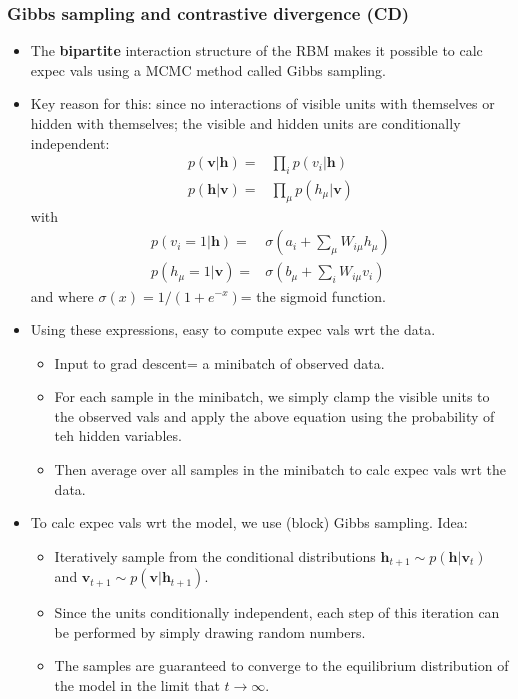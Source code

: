 \documentclass[norsk,a4paper,11pt]{article}
\begin{document}
\subsubsection{Gibbs sampling and contrastive divergence (CD)}
\begin{itemize}
	\item The \textbf{bipartite} interaction structure of the RBM makes it possible to calc expec vals using a MCMC method called Gibbs sampling.
	\item Key reason for this: since no interactions of visible units with themselves or hidden with themselves; the visible and hidden units are conditionally independent:
	\begin{align}
		p(\bm{v}|\bm{h}) =& \prod_i p(v_i | \bm{h}) \\
		p(\bm{h}|\bm{v}) =& \prod_\mu p(h_\mu| \bm{v})
	\end{align}
	with
	\begin{align}
		p(v_i = 1| \bm{h}) =& \sigma(a_i + \sum_\mu W_{i\mu} h_\mu) \\
		p(h_\mu = 1| \bm{v}) =& \sigma(b_\mu + \sum_i W_{i\mu} v_i)
	\end{align}
	and where $\sigma(x) = 1/(1+e^{-x})$= the sigmoid function.
	\item Using these expressions, easy to compute expec vals wrt the data. 
	\begin{itemize}
		\item Input to grad descent= a minibatch of observed data. 
		\item For each sample in the minibatch, we simply clamp the visible units to the observed vals and apply the above equation using the probability of teh hidden variables.
		\item Then average over all samples in the minibatch to calc expec vals wrt the data.
	\end{itemize}
	\item To calc expec vals wrt the model, we use (block) Gibbs sampling. Idea: 
	\begin{itemize}
		\item Iteratively sample from the conditional distributions $\bm{h}_{t+1} \sim p(\bm{h}| \bm{v}_t)$ and $\bm{v}_{t+1} \sim p(\bm{v}|\bm{h}_{t+1})$.
		\item Since the units conditionally independent, each step of this iteration can be performed by simply drawing random numbers.
		\item The samples are guaranteed to converge to the equilibrium distribution of the model in the limit that $t\rightarrow \infty$.

\end{itemize}
\end{itemize}
\end{document}
